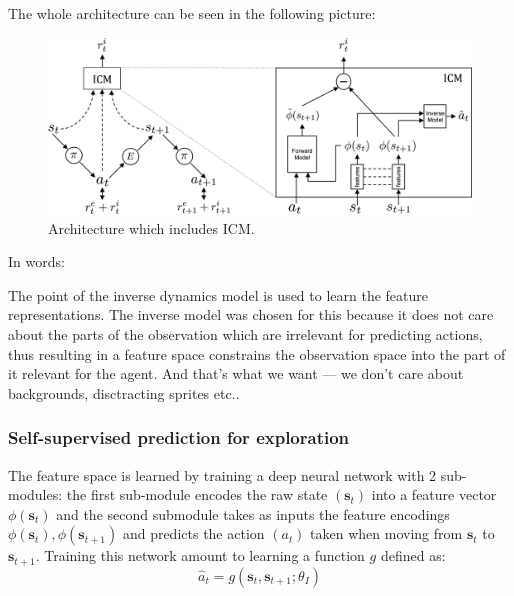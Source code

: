 \documentclass{article}
\begin{document}
The whole architecture can be seen in the following picture:
\begin{figure}[htpb]
		\centering
		\includegraphics[width=1.0\textwidth]{./method.jpg}
		\caption{Architecture which includes ICM.}
		\label{fig:-method-jpg}
\end{figure}
In words:

The point of the inverse dynamics model is used to learn the feature representations.
The inverse model was chosen for this because it does not care about 
the parts of the observation which are irrelevant for predicting actions, 
thus resulting in a feature space constrains the observation space into
the part of it relevant for the agent.
And that's what we want --- we don't care about backgrounds,
disctracting sprites etc..

\subsubsection{Self-supervised prediction for exploration}
The feature space is learned by training a deep neural network with 
2 sub-modules:
the first sub-module encodes the raw state $ (\bm{s}_{t})  $ into a feature
vector $ \phi (\bm{s}_{t})  $ and the second
submodule takes as inputs the feature encodings
$ \phi (\bm{s}_{t}), \phi(\bm{s}_{t+1})  $
and predicts the action $ (a_{t})  $
taken when moving from $ \bm{s}_{t}  $ to $ \bm{s}_{t+1}  $.
Training this network amount to learning a function $ g  $ defined as:
\begin{equation}
		\hat{a}_{ t } = g \left( \bm{s}_{t}, \bm{s}_{t+1}; \theta_{ I } \right) 
\end{equation}
\end{document}
